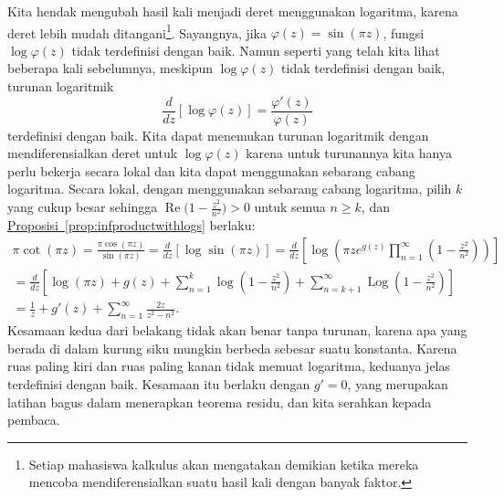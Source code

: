 \documentclass[12pt,openany]{book}
\renewcommand{\Re}{\operatorname{Re}}
\newcommand{\Log}{\operatorname{Log}}
\theoremstyle{plain}
\theoremstyle{remark}
\theoremstyle{definition}
\theoremstyle{exercise}
\theoremstyle{example}
\newcommand{\propref}[1]{\hyperref[#1]{Proposisi~\ref*{#1}}}
\begin{document}
Kita hendak mengubah hasil kali menjadi deret menggunakan
logaritma, karena deret lebih mudah ditangani\footnote{Setiap mahasiswa kalkulus
akan mengatakan demikian ketika mereka mencoba mendiferensialkan suatu hasil kali dengan banyak
faktor.}.  Sayangnya, jika $\varphi(z) =
\sin(\pi z)$, fungsi
$\log \varphi(z)$ tidak terdefinisi dengan baik.
Namun seperti yang telah kita lihat beberapa kali sebelumnya, meskipun $\log \varphi(z)$ tidak
terdefinisi dengan baik, turunan logaritmik
\begin{equation*}
\frac{d}{dz} \left[
\log \varphi(z)
\right]
=
\frac{\varphi'(z)}{\varphi(z)}
\end{equation*}
terdefinisi dengan baik.  Kita dapat menemukan turunan logaritmik dengan mendiferensialkan
deret untuk $\log \varphi(z)$
karena untuk turunannya kita hanya perlu bekerja secara lokal dan kita dapat menggunakan
sebarang cabang logaritma.
Secara lokal, dengan menggunakan sebarang cabang logaritma,
pilih $k$ yang cukup besar sehingga $\Re \bigl( 1-\frac{z^2}{n^2} \bigr) > 0$
untuk semua $n \geq k$, dan
\propref{prop:infproductwithlogs} berlaku:
\begin{multline*}
\pi \cot (\pi z) =
\frac{\pi \cos (\pi z)}{\sin(\pi z)}
=
\frac{d}{dz} \left[
\log \sin (\pi z)
\right]
=
\frac{d}{dz} \left[
\log 
\left(
\pi z
e^{g(z)}
\prod_{n=1}^\infty 
\left(1-\frac{z^2}{n^2}\right)
\right)
\right]
\\
=
\frac{d}{dz} \left[
\log(\pi z)
+
g(z)
+
\sum_{n=1}^k 
\log
\left(1-\frac{z^2}{n^2}\right)
+
\sum_{n=k+1}^\infty
\Log
\left(1-\frac{z^2}{n^2}\right)
\right]
\\
=
\frac{1}{z}
+
g'(z)
+
\sum_{n=1}^\infty 
\frac{2z}{z^2-n^2} .
\end{multline*}
Kesamaan kedua dari belakang tidak akan benar tanpa turunan, karena apa yang
berada di dalam kurung siku mungkin berbeda sebesar suatu konstanta.
Karena ruas paling kiri dan ruas paling kanan tidak memuat
logaritma, keduanya jelas terdefinisi dengan baik.
Kesamaan itu berlaku dengan $g'=0$, yang merupakan 
latihan bagus dalam menerapkan teorema residu, dan kita
serahkan kepada pembaca.
\end{document}

